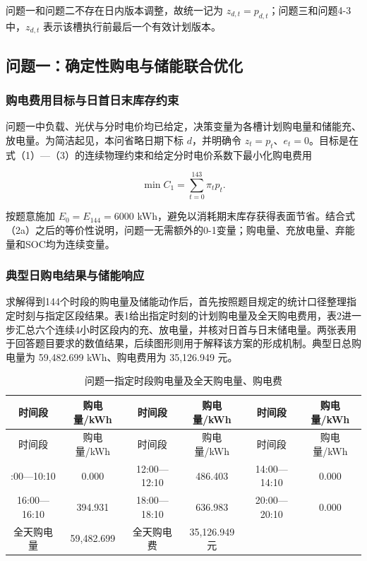 \documentclass[zihao=-4,a4paper,UTF8,fontset=none]{ctexart}
\begin{document}
问题一和问题二不存在日内版本调整，故统一记为 \(z_{d,t}=p_{d,t}\)；问题三和问题4-3中，\(z_{d,t}\) 表示该槽执行前最后一个有效计划版本。

\subsection{问题一：确定性购电与储能联合优化}\label{ux95eeux9898ux4e00ux786eux5b9aux6027ux8d2dux7535ux4e0eux50a8ux80fdux8054ux5408ux4f18ux5316}

\subsubsection{购电费用目标与日首日末库存约束}\label{ux8d2dux7535ux8d39ux7528ux76eeux6807ux4e0eux65e5ux9996ux65e5ux672bux5e93ux5b58ux7ea6ux675f}

问题一中负载、光伏与分时电价均已给定，决策变量为各槽计划购电量和储能充、放电量。为简洁起见，本问省略日期下标 \(d\)，并明确令 \(z_t=p_t\)、\(e_t=0\)。目标是在式（1）---（3）的连续物理约束和给定分时电价系数下最小化购电费用

\[
\min C_1=\sum_{t=0}^{143}\pi_t p_t.
\tag{4}
\]

按题意施加 \(E_0=E_{144}=6000\) kWh，避免以消耗期末库存获得表面节省。结合式（2a）之后的等价性说明，问题一无需额外的0-1变量；购电量、充放电量、弃能量和SOC均为连续变量。

\subsubsection{典型日购电结果与储能响应}\label{ux5178ux578bux65e5ux8d2dux7535ux7ed3ux679cux4e0eux50a8ux80fdux54cdux5e94}

求解得到144个时段的购电量及储能动作后，首先按照题目规定的统计口径整理指定时刻与指定区段结果。表1给出指定时刻的计划购电量及全天购电费用，表2进一步汇总六个连续4小时区段内的充、放电量，并核对日首与日末储电量。两张表用于回答题目要求的数值结果，后续图形则用于解释该方案的形成机制。典型日总购电量为 59,482.699 kWh、购电费用为 35,126.949 元。

\begin{longtable}[]{@{}cccccc@{}}
\caption{问题一指定时段购电量及全天购电量、购电费}\label{tab:paper-1}\tabularnewline
\toprule\noalign{}
时间段 & 购电量/kWh & 时间段 & 购电量/kWh & 时间段 & 购电量/kWh \\
\midrule\noalign{}
\endfirsthead
\toprule\noalign{}
时间段 & 购电量/kWh & 时间段 & 购电量/kWh & 时间段 & 购电量/kWh \\
\midrule\noalign{}
\endhead
\bottomrule\noalign{}
\endlastfoot
10:00---10:10 & 0.000 & 12:00---12:10 & 486.403 & 14:00---14:10 & 0.000 \\
16:00---16:10 & 394.931 & 18:00---18:10 & 636.983 & 20:00---20:10 & 0.000 \\
全天购电量 & 59,482.699 & 全天购电费 & 35,126.949 元 & & \\
\end{longtable}
\end{document}

